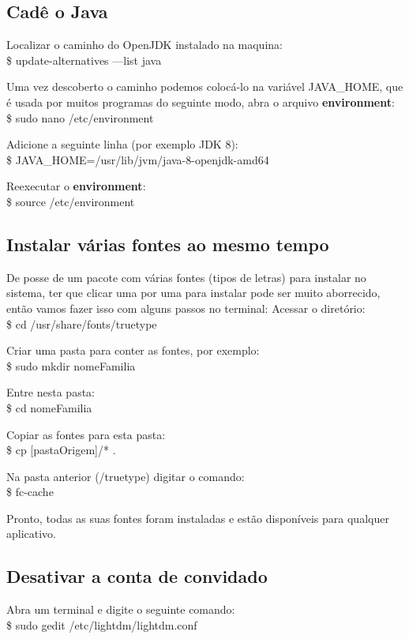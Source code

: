 \subsection{Cadê o Java}
Localizar o caminho do OpenJDK instalado na maquina: \\
{\ttfamily\$ update-alternatives ---list java}

Uma vez descoberto o caminho podemos colocá-lo na variável JAVA\_HOME, que é usada por muitos programas do seguinte modo, abra o arquivo \textbf{environment}:  \\
{\ttfamily\$ sudo nano /etc/environment}

Adicione a seguinte linha (por exemplo JDK 8):  \\
{\ttfamily\$ JAVA\_HOME=/usr/lib/jvm/java-8-openjdk-amd64}

Reexecutar o \textbf{environment}:  \\
{\ttfamily\$ source /etc/environment}

\subsection{Instalar várias fontes ao mesmo tempo}
De posse de um pacote com várias fontes (tipos de letras) para instalar no sistema, ter que clicar uma por uma para instalar pode ser muito aborrecido, então vamos fazer isso com alguns passos no terminal: 
Acessar o diretório: \\
{\ttfamily\$ cd /usr/share/fonts/truetype}

Criar uma pasta para conter as fontes, por exemplo: \\
{\ttfamily\$ sudo mkdir nomeFamilia}

Entre nesta pasta: \\
{\ttfamily\$ cd nomeFamilia}

Copiar as fontes para esta pasta: \\
{\ttfamily\$ cp [pastaOrigem]/* .}

Na pasta anterior (/truetype) digitar o comando: \\
{\ttfamily\$ fc-cache}

Pronto, todas as suas fontes foram instaladas e estão disponíveis para qualquer aplicativo.

\subsection{Desativar a conta de convidado}
Abra um terminal e digite o seguinte comando: \\
{\ttfamily\$ sudo gedit /etc/lightdm/lightdm.conf}


